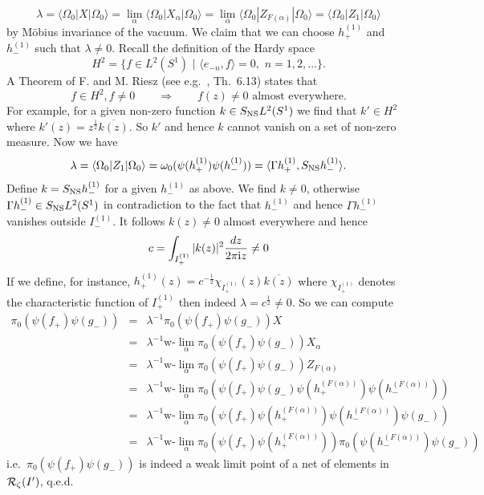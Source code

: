 \documentclass[10pt,a4paper]{article}
\begin{document}
\[ \lambda = \langle\Omega_0|X|\Omega_0\rangle =
\lim_\alpha \langle\Omega_0|X_\alpha|\Omega_0\rangle
= \lim_\alpha \langle\Omega_0|Z_{F(\alpha)}|\Omega_0\rangle
= \langle\Omega_0|Z_1|\Omega_0\rangle \]
by M{\"o}bius invariance of the vacuum.
We claim that we can choose $h_+^{(1)}$ and $h_-^{(1)}$
such that $\lambda\neq 0$. Recall the definition of the
Hardy space
\[ H^2 = \{ f\in L^2(S^1)\,\,|\,\, \langle e_{-n},f \rangle
=0, \,\, n=1,2,\ldots \}. \]
A Theorem of F. and M. Riesz (see e.g.~\cite{Doug}, Th.~6.13)
states that
\begin{equation}
\label{Riesz}
f\in H^2,f\neq 0 \qquad \Longrightarrow \qquad
f(z)\neq 0 \mbox{ almost everywhere}.
\end{equation}
For example, for a given non-zero function
$k\in S_{\rm NS}L^2(S^1)$
we find that $k'\in H^2$ where $k'(z)=z^\frac{1}{2}
\overline{k(z)}$. So $k'$ and hence $k$ cannot vanish
on a set of non-zero measure. Now we have
\[ \lambda = \langle\Omega_0|Z_1|\Omega_0\rangle =
\omega_0(\psi(h_+^{(1)})\psi(h_-^{(1)}))=
\langle\Gamma h_+^{(1)},S_{\rm NS} h_-^{(1)} \rangle. \]
Define $k=S_{\rm NS}h_-^{(1)}$ for a given $h_-^{(1)}$
as above. We find $k\neq 0$, otherwise
$\Gamma h_-^{(1)}\in S_{\rm NS}L^2(S^1)$ in
contradiction to the fact that $h_-^{(1)}$ and
hence $\Gamma h_-^{(1)}$ vanishes outside
$I_-^{(1)}$. It follows $k(z)\neq 0$ almost everywhere
and hence
\[ c=\int_{I_+^{(1)}} |k(z)|^2 \frac{dz}{2\pi{\rm i} z}
\neq 0 \]
If we define, for instance,
$h_+^{(1)}(z)=c^{-\frac{1}{2}} \chi_{I_+^{(1)}}(z)
\overline{k(z)}$
where $\chi_{I_+^{(1)}}$ denotes the characteristic
function of $I_+^{(1)}$ then indeed
$\lambda=c^\frac{1}{2}\neq 0$. So we can compute
\begin{eqnarray*}
\pi_0(\psi(f_+)\psi(g_-)) &=& \lambda^{-1} \pi_0
(\psi(f_+)\psi(g_-)) X \\
&=& \lambda^{-1} \mbox{w-}\lim_\alpha
\pi_0(\psi(f_+)\psi(g_-))X_\alpha \\
&=& \lambda^{-1} \mbox{w-}\lim_\alpha
\pi_0(\psi(f_+)\psi(g_-))Z_{F(\alpha)} \\
&=& \lambda^{-1} \mbox{w-}\lim_\alpha
\pi_0(\psi(f_+)\psi(g_-)\psi(h_+^{(F(\alpha))})
\psi(h_-^{(F(\alpha))}))\\
&=& \lambda^{-1} \mbox{w-}\lim_\alpha
\pi_0(\psi(f_+)\psi(h_+^{(F(\alpha))})
\psi(h_-^{(F(\alpha))})\psi(g_-))\\
&=& \lambda^{-1} \mbox{w-}\lim_\alpha
\pi_0(\psi(f_+)\psi(h_+^{(F(\alpha))}))
\pi_0(\psi(h_-^{(F(\alpha))})\psi(g_-))
\end{eqnarray*}
i.e.~$\pi_0(\psi(f_+)\psi(g_-))$ is indeed a weak limit
point of a net of elements in ${\cal R}_\zeta(I')$,
q.e.d.
\end{document}
